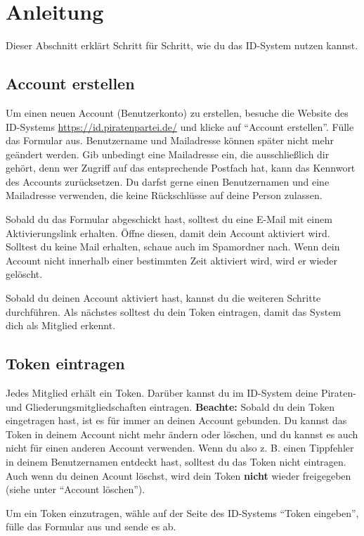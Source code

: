 \documentclass[parskip=half]{scrartcl}
\begin{document}
\newpage
\section{Anleitung}
Dieser Abschnitt erklärt Schritt für Schritt, wie du das ID-System nutzen kannst.

\subsection{Account erstellen}
Um einen neuen Account (Benutzerkonto) zu erstellen, besuche die Website des ID-Systems \url{https://id.piratenpartei.de/} und klicke auf "`Account erstellen"'.
Fülle das Formular aus.
Benutzername und Mailadresse können später nicht mehr geändert werden.
Gib unbedingt eine Mailadresse ein, die ausschließlich dir gehört, denn wer Zugriff auf das entsprechende Postfach hat, kann das Kennwort des Accounts zurücksetzen.
Du darfst gerne einen Benutzernamen und eine Mailadresse verwenden, die keine Rück\-schlüs\-se auf deine Person zulassen.

Sobald du das Formular abgeschickt hast, solltest du eine E-Mail mit einem Aktivierungslink erhalten.
Öffne diesen, damit dein Account aktiviert wird.
Solltest du keine Mail erhalten, schaue auch im Spamordner nach.
Wenn dein Account nicht innerhalb einer bestimmten Zeit aktiviert wird, wird er wieder gelöscht.

Sobald du deinen Account aktiviert hast, kannst du die weiteren Schritte durchführen.
Als nächstes solltest du dein Token eintragen, damit das System dich als Mitglied erkennt.

\subsection{Token eintragen}
Jedes Mitglied erhält ein Token. Darüber kannst du im ID-System deine Piraten- und Gliederungsmitgliedschaften eintragen.
\textbf{Beachte:} Sobald du dein Token eingetragen hast, ist es für immer an deinen Account gebunden.
Du kannst das Token in deinem Account nicht mehr ändern oder löschen, und du kannst es auch nicht für einen anderen Account verwenden.
Wenn du also z. B. einen Tippfehler in deinem Benutzernamen entdeckt hast, solltest du das Token nicht eintragen.
Auch wenn du deinen Acount löschst, wird dein Token \textbf{nicht} wieder freigegeben (siehe unter "`Account löschen"').

Um ein Token einzutragen, wähle auf der Seite des ID-Systems "`Token eingeben"', fülle das Formular aus und sende es ab.
\end{document}

